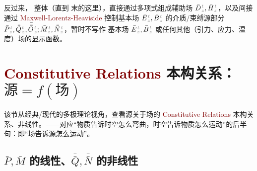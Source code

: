 反过来， 整体（直到  末的这里），直接通过多项式组成辅助场 $\bar{D}^{\;\!\mathcolor{gray}{t}}_{\;\!\mathcolor{gray}{z}}, \bar{H}^{\;\!\mathcolor{gray}{t}}_{\;\!\mathcolor{gray}{z}}$，以及间接通过 \textcolor{Maroon}{Maxwell-Lorentz-Heaviside}  控制基本场 $\bar{E}^{\;\!\mathcolor{gray}{t}}_{\;\!\mathcolor{gray}{z}}, \bar{B}^{\;\!\mathcolor{gray}{t}}_{\;\!\mathcolor{gray}{z}}$ 的介质/束缚源部分 $\bar{P}^{\;\!\mathcolor{gray}{t}}_{\;\!\mathcolor{gray}{z}},\bar{\bar{Q}}^{\;\!\mathcolor{gray}{t}}_{\;\!\mathcolor{gray}{z}},\bar{\bar{\bar{O}}}^{\;\!\mathcolor{gray}{t}}_{\;\!\mathcolor{gray}{z}} ; \bar{M}^{\;\!\mathcolor{gray}{t}}_{\;\!\mathcolor{gray}{z}}, \bar{\bar{N}}^{\;\!\mathcolor{gray}{t}}_{\;\!\mathcolor{gray}{z}}$，暂时不写作 基本场 $\bar{E}^{\;\!\mathcolor{gray}{t}}_{\;\!\mathcolor{gray}{z}}, \bar{B}^{\;\!\mathcolor{gray}{t}}_{\;\!\mathcolor{gray}{z}}$ 或任何其他（引力、应力、温度）场的显示函数。

\section{\textcolor{Maroon}{Constitutive Relations} 本构关系：$\text{源} = f(\text{场})$}\label{sec:constitutive}

该节从经典/现代的多极理论视角，查看源关于场的 \textcolor{Maroon}{Constitutive Relations} 本构关系、非线性。——对应“物质告诉时空怎么弯曲，时空告诉物质怎么运动”的后半句：即“场告诉源怎么运动”。

\vspace*{-4.0em}

\subsection{$\bar{P},\bar{M}$ 的线性、$\bar{\bar{Q}},\bar{\bar{N}}$ 的非线性}\label{ssec:PMQN-nonlinear}

